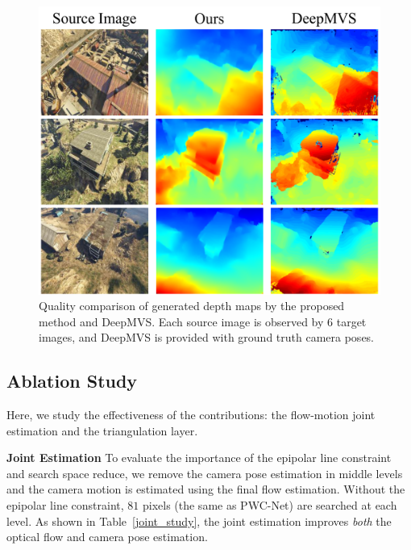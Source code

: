 \documentclass[letterpaper, 10 pt, conference]{ieeeconf}  %
\begin{document}
\begin{figure}[h]
\begin{center}
\includegraphics[width=0.90\linewidth]{figs/deepmvs.pdf}
\end{center}
\vspace{-0.2cm}
\caption{Quality comparison of generated depth maps by the proposed method and DeepMVS. Each source image is observed by 6 target images, and DeepMVS is provided with ground truth camera poses.}
\vspace{-0.2cm}
\label{fig:deepmvs}
\end{figure}
 
\subsection{Ablation Study}
 
Here, we study the effectiveness of the contributions: the flow-motion joint estimation and the triangulation layer.
 
\textbf{Joint Estimation} To evaluate the importance of the epipolar line constraint and search space reduce, we remove the camera pose estimation in middle levels and the camera motion is estimated using the final flow estimation. Without the epipolar line constraint, $81$ pixels (the same as PWC-Net) are searched at each level. As shown in Table~\ref{joint_study}, the joint estimation improves \textit{both} the optical flow and camera pose estimation.
 
\begin{table}[h]
\centering
\caption{Effectiveness of the joint flow-motion estimation}
\label{joint_study}
\vspace{-0.4cm}
\end{table}
 
\end{document}
